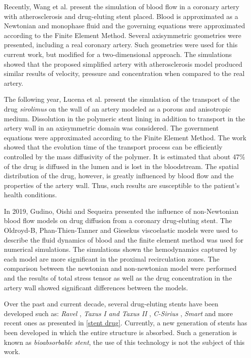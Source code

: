 \medskip
Recently, Wang et al. \cite{wang2017} present the simulation
 of blood flow in a coronary artery with atherosclerosis and
 drug-eluting stent placed. Blood is approximated as a Newtonian and
 monophase fluid and the governing equations were approximated
 according to the Finite Element Method. Several axisymmetric
 geometries were presented, including a real coronary artery.
 Such geometries were used for this current work, but modified
 for a two-dimensional approach. The simulations showed that
 the proposed simplified artery with atherosclerosis model
 produced similar results of velocity, pressure and concentration
 when compared to the real artery.

\medskip
The following year, Lucena et al. \cite{lucena2018} present 
the simulation of the transport of the drug \textit{sirolimus}
 on the wall of an artery modeled as a porous and anisotropic medium.
 Dissolution in the polymeric stent lining in addition to transport
 in the artery wall in an axisymmetric domain was considered.
 The government equations were approximated according to
 the Finite Element Method. The work showed that the evolution time
 of the transport process can be efficiently controlled by
 the mass diffusivity of the polymer. It is estimated that
 about 47\% of the drug is diffused in the lumen and is lost in
 the bloodstream. The spatial distribution of the drug, however,
 is greatly influenced by blood flow and the properties of 
the artery wall. Thus, such results are susceptible to the
 patient's health conditions.

\medskip
In 2019, Gudino, Oishi and Sequeira \cite{gudino2019} presented
the influence of non-Newtonian blood flow models on drug
diffusion from a coronary drug-eluting stent. 
The Oldroyd-B, Phan-Thien-Tanner and Giesekus viscoelastic models
were used to describe the fluid dynamics of blood and the finite
element method was used for numerical simulations. The simulations
shown the hemodynamics captured by each model are more significant
in the proximal recirculation zones. The comparison between the
newtonian and non-newtonian model were performed and
the results of total stress tensor as well as the drug concentration in the artery
wall showed significant differences between the models. 


\medskip
Over the past and current decade, several drug-eluting stents
 have been developed such as: \textit{Ravel} \cite{morice2002},
 \textit{Taxus I and Taxus II} \cite{grube2003} \cite{colombo2003},
 \textit{C-Sirius} \cite{schampaert2004},
 \textit{Smart} \cite{ardissino2004} and
 more recent ones as presented in \ref{stent drug}. 
Currently, a new generation of stents has been developed
 in which the entire structure is absorbed. 
Such a generation is known as \textit{bioabsorbable stent}, 
the use of this technology is not the subject of this work.


